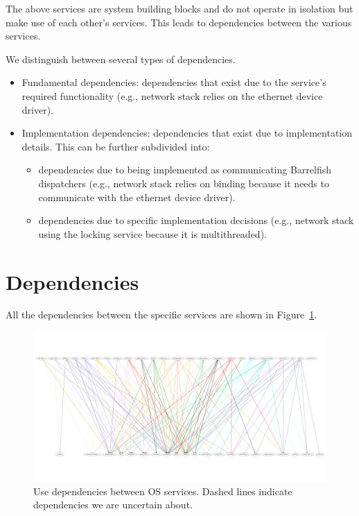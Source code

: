 \documentclass[a4paper,twoside]{report} %
\begin{document}
The above services are system building blocks and do not operate in
isolation but make use of each other's services.
This leads to dependencies between the various services.

We distinguish between several types of dependencies.
\begin{itemize}
  \item Fundamental dependencies: dependencies that exist due to
    the service's required functionality (e.g., network stack relies on
    the ethernet device driver).
  \item Implementation dependencies: dependencies that exist due
    to implementation details.  This can be further subdivided into:
    \begin{itemize}
      \item dependencies due to being implemented as communicating
        Barrelfish dispatchers (e.g., network stack relies on binding
        because it needs to communicate with the ethernet device
        driver).
      \item dependencies due to specific implementation decisions
        (e.g., network stack using the locking service because it is
        multithreaded).
    \end{itemize}
\end{itemize}




\section{Dependencies}\label{chap:dependencies}

All the dependencies between the specific services are shown in
Figure~\ref{fig:dep2-a}.

\begin{figure}[hbt]
 \begin{center}
 \includegraphics[angle=270,scale=0.15]{dep2-a-dot.pdf}
 \end{center}
 \caption{Use dependencies between OS services. Dashed lines indicate
   dependencies we are uncertain about.}\label{fig:dep2-a}
\end{figure}
\end{document}
